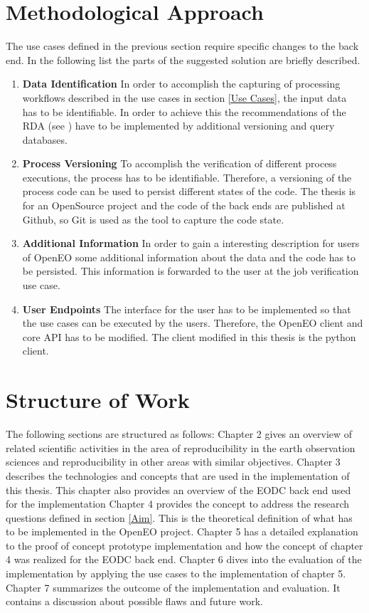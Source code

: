\documentclass[draft,final]{vutinfth} %
\begin{document}
\section{Methodological Approach}\label{Method}
The use cases defined in the previous section require specific changes to the back end. In the following list the parts of the suggested solution are briefly described. 

\begin{enumerate}
	\item \textbf{Data Identification}
	In order to accomplish the capturing of processing workflows described in the use cases in section \ref{Use Cases}, the input data has to be identifiable. In order to achieve this the recommendations of the RDA (see \cite{Rauber2016IdentificationOR}) have to be implemented by additional versioning and query databases. 
	
	\item \textbf{Process Versioning}
	To accomplish the verification of different process executions, the process has to be identifiable. Therefore, a versioning of the process code can be used to persist different states of the code. The thesis is for an OpenSource project and the code of the back ends are published at Github, so Git is used as the tool to capture the code state. 
	
	\item \textbf{Additional Information}
	In order to gain a interesting description for users of OpenEO some additional information about the data and the code has to be persisted. This information is forwarded to the user at the job verification use case.   
	
	\item \textbf{User Endpoints}
	The interface for the user has to be implemented so that the use cases can be executed by the users. Therefore, the OpenEO client and core API has to be modified. The client modified in this thesis is the python client. 
\end{enumerate}

\section{Structure of Work}\label{Structure}
The following sections are structured as follows:
Chapter 2 gives an overview of related scientific activities in the area of reproducibility in the earth observation sciences and reproducibility in other areas with similar objectives.
Chapter 3  describes the technologies and concepts that are used in the implementation of this thesis. This chapter also provides an overview of the EODC back end used for the implementation
Chapter 4 provides the concept to address the research questions defined in section \ref{Aim}.  This is the theoretical definition of what has to be implemented in the OpenEO project.
Chapter 5 has a detailed explanation to the proof of concept prototype implementation and how the concept of chapter 4 was realized for the EODC back end. 
Chapter 6 dives into the evaluation of the implementation by applying the use cases to the implementation of chapter 5.
Chapter 7 summarizes the outcome of the implementation and evaluation. It contains a discussion about possible flaws and future work. 
\end{document}
